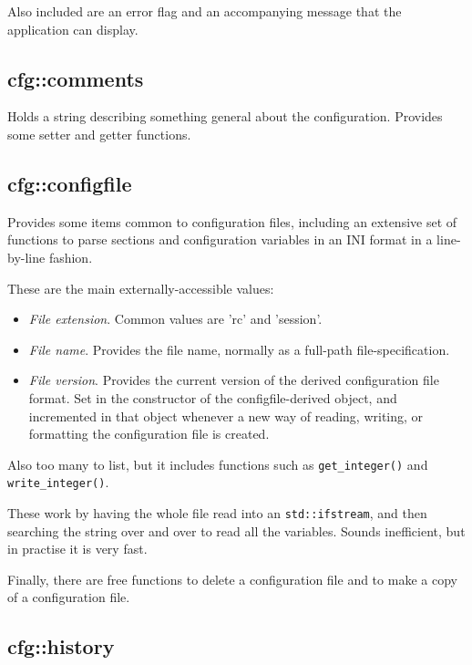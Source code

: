    Also included are an error flag and an accompanying message that the
   application can display.

\subsection{cfg::comments}
\label{subsec:cfg_namespace_comments}

   Holds a string describing something general about the configuration.
   Provides some setter and getter functions.

\subsection{cfg::configfile}
\label{subsec:cfg_namespace_configfile}

   Provides some items common to configuration files, including
   an extensive set of functions to parse sections and configuration
   variables in an
   INI format in a line-by-line fashion.

   These are the main externally-accessible values:

   \begin{itemize}
      \item \textsl{File extension}.
         Common values are 'rc' and 'session'.
      \item \textsl{File name}.
         Provides the file name, normally as a full-path file-specification.
      \item \textsl{File version}.
         Provides the current version of the derived configuration file format.
         Set in the constructor of the configfile-derived object,
         and incremented in that object whenever a new way of reading,
         writing, or formatting the configuration file is created.
   \end{itemize}

   Also too many to list, but it includes functions such as
   \texttt{get\_integer()} and \texttt{write\_integer()}.

   These work by having the whole file read into an
   \texttt{std::ifstream}, and then searching the string over and over
   to read all the variables.
   Sounds inefficient, but in practise it is very fast.

   Finally, there are free functions to delete a configuration file and
   to make a copy of a configuration file.

\subsection{cfg::history}
\label{subsec:cfg_namespace_history}

